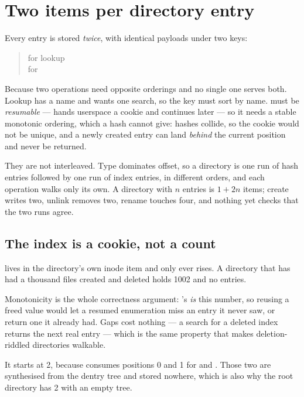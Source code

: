 \section{Two items per directory entry}

Every entry is stored \emph{twice}, with identical payloads under two keys:

\begin{quote}
 \quad for lookup\\
 \quad for 
\end{quote}

Because two operations need opposite orderings and no single one serves both.
Lookup has a name and wants one search, so the key must sort by name.
 must be \emph{resumable} ---  hands userspace a
cookie and continues later --- so it needs a stable monotonic ordering, which a
hash cannot give: hashes collide, so the cookie would not be unique, and a
newly created entry can land \emph{behind} the current position and never be
returned.

They are not interleaved. Type dominates offset, so a directory is one run of
hash entries followed by one run of index entries, in different orders, and each
operation walks only its own. A directory with $n$ entries is $1 + 2n$ items;
create writes two, unlink removes two, rename touches four, and nothing yet
checks that the two runs agree.

\subsection{The index is a cookie, not a count}

 lives in the directory's own inode item and only ever
rises. A directory that has had a thousand files created and deleted holds 1002
and no entries.

Monotonicity is the whole correctness argument: 's
 \emph{is} this number, so reusing a freed value would let a
resumed enumeration miss an entry it never saw, or return one it already had.
Gaps cost nothing --- a search for a deleted index returns the next real entry
--- which is the same property that makes deletion-riddled directories walkable.

It starts at 2, because  consumes positions 0 and 1 for
 and . Those two are synthesised from the dentry tree and
stored nowhere, which is also why the root directory has  2 with an
empty tree.

